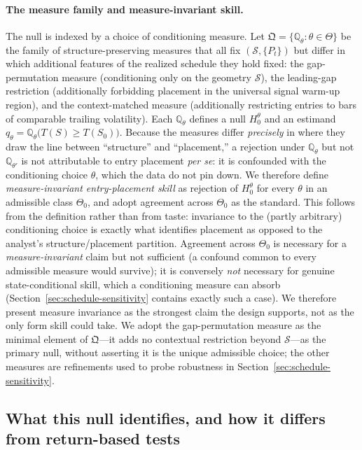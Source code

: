 \documentclass[preprint,12pt]{elsarticle}
\theoremstyle{definition}
\begin{document}
\paragraph{The measure family and measure-invariant skill.} The null is indexed by a choice of conditioning measure. Let $\mathfrak{Q}=\{\mathbb{Q}_\theta:\theta\in\Theta\}$ be the family of structure-preserving measures that all fix $(\mathcal S,\{P_t\})$ but differ in which additional features of the realized schedule they hold fixed: the gap-permutation measure (conditioning only on the geometry $\mathcal S$), the leading-gap restriction (additionally forbidding placement in the universal signal warm-up region), and the context-matched measure (additionally restricting entries to bars of comparable trailing volatility). Each $\mathbb{Q}_\theta$ defines a null $H_0^\theta$ and an estimand $q_\theta=\mathbb{Q}_\theta\big(T(S)\ge T(S_0)\big)$. Because the measures differ \emph{precisely} in where they draw the line between ``structure'' and ``placement,'' a rejection under $\mathbb{Q}_\theta$ but not $\mathbb{Q}_{\theta'}$ is not attributable to entry placement \emph{per se}: it is confounded with the conditioning choice $\theta$, which the data do not pin down. We therefore define \emph{measure-invariant entry-placement skill} as rejection of $H_0^\theta$ for every $\theta$ in an admissible class $\Theta_0$, and adopt agreement across $\Theta_0$ as the standard. This follows from the definition rather than from taste: invariance to the (partly arbitrary) conditioning choice is exactly what identifies placement as opposed to the analyst's structure/placement partition. Agreement across $\Theta_0$ is necessary for a \emph{measure-invariant} claim but not sufficient (a confound common to every admissible measure would survive); it is conversely \emph{not} necessary for genuine state-conditional skill, which a conditioning measure can absorb (Section~\ref{sec:schedule-sensitivity} contains exactly such a case). We therefore present measure invariance as the strongest claim the design supports, not as the only form skill could take. We adopt the gap-permutation measure as the minimal element of $\mathfrak{Q}$---it adds no contextual restriction beyond $\mathcal S$---as the primary null, without asserting it is the unique admissible choice; the other measures are refinements used to probe robustness in Section~\ref{sec:schedule-sensitivity}.

\subsection{What this null identifies, and how it differs from return-based tests}
\end{document}
